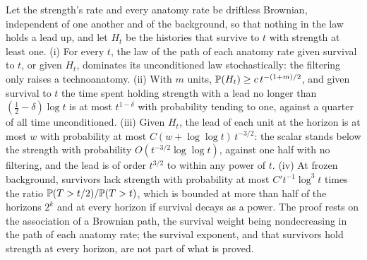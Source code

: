 \begin{theorem}\label{imp:pace}
Let the strength's rate and every anatomy rate be driftless Brownian,
independent of one another and of the background, so that nothing in the
law holds a lead up, and let $H_t$ be the histories that survive to $t$
with strength at least one. (i) For every $t$, the law of the path of
each anatomy rate given survival to $t$, or given $H_t$, dominates its
unconditioned law stochastically: the filtering only raises a
technoanatomy. (ii) With $m$ units, $\mathbb{P}(H_t)\ge c\,t^{-(1+m)/2}$, and
given survival to $t$ the time spent holding strength with a lead no
longer than $(\tfrac12-\delta)\log t$ is at most $t^{1-\delta}$ with
probability tending to one, against a quarter of all time unconditioned.
(iii) Given $H_t$, the lead of each unit at the horizon is at most $w$
with probability at most $C(w+\log\log t)\,t^{-3/2}$: the scalar stands
below the strength with probability $O(t^{-3/2}\log\log t)$, against one
half with no filtering, and the lead is of order $t^{3/2}$ to within any
power of $t$. (iv) At frozen background, survivors lack strength with
probability at most $C't^{-1}\log^3t$ times the ratio
$\mathbb{P}(T>t/2)/\mathbb{P}(T>t)$, which is bounded at more than half of the horizons
$2^k$ and at every horizon if survival decays as a power. The proof rests
on the association of a Brownian path, the survival weight being
nondecreasing in the path of each anatomy rate; the survival exponent,
and that survivors hold strength at every horizon, are not part of what
is proved.
\end{theorem}

